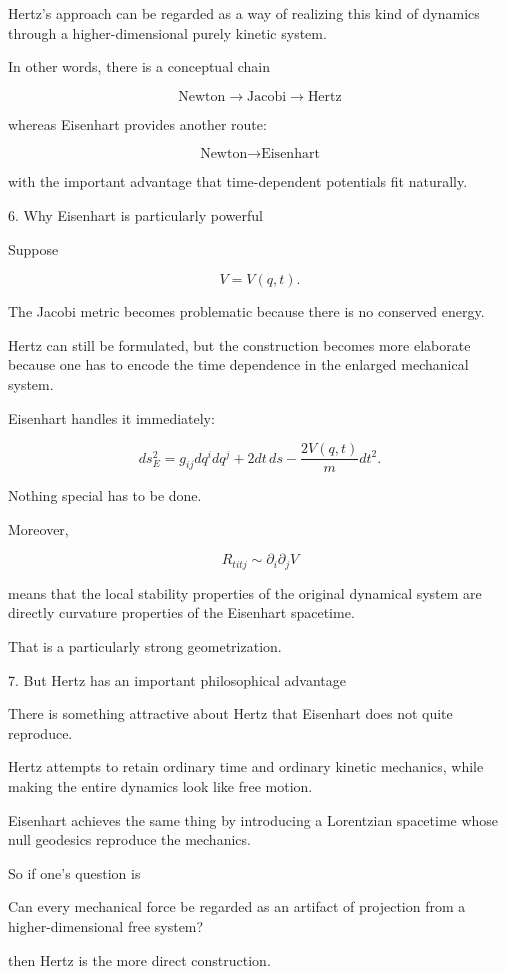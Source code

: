 Hertz's approach can be regarded as a way of realizing this kind of dynamics through a higher-dimensional purely kinetic system.

In other words, there is a conceptual chain

$$ \boxed{ \text{Newton} \rightarrow \text{Jacobi} \rightarrow \text{Hertz} } $$

whereas Eisenhart provides another route:

$$ \boxed{ \text{Newton} \rightarrow \text{Eisenhart} } $$

with the important advantage that time-dependent potentials fit naturally.

6. Why Eisenhart is particularly powerful

Suppose

$$ V=V(q,t). $$

The Jacobi metric becomes problematic because there is no conserved energy.

Hertz can still be formulated, but the construction becomes more elaborate because one has to encode the time dependence in the enlarged mechanical system.

Eisenhart handles it immediately:

$$ ds_E^2 = g_{ij}dq^i dq^j +2dt\,ds -\frac{2V(q,t)}m dt^2. $$

Nothing special has to be done.

Moreover,

$$ R_{titj}\sim \partial_i\partial_jV $$

means that the local stability properties of the original dynamical system are directly curvature properties of the Eisenhart spacetime.

That is a particularly strong geometrization.

7. But Hertz has an important philosophical advantage

There is something attractive about Hertz that Eisenhart does not quite reproduce.

Hertz attempts to retain ordinary time and ordinary kinetic mechanics, while making the entire dynamics look like free motion.

Eisenhart achieves the same thing by introducing a Lorentzian spacetime whose null geodesics reproduce the mechanics.

So if one's question is

Can every mechanical force be regarded as an artifact of projection from a higher-dimensional free system?

then Hertz is the more direct construction.

